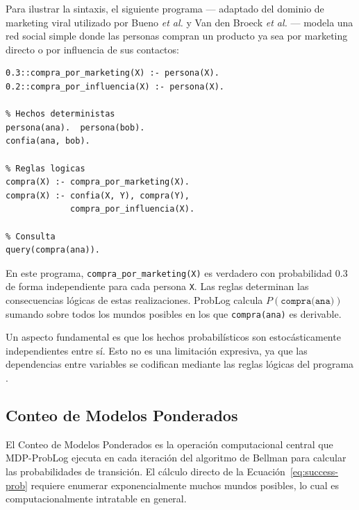 Para ilustrar la sintaxis, el siguiente programa --- adaptado del dominio de marketing viral utilizado por Bueno \textit{et al.} \cite{bueno2016mdp} y Van den Broeck \textit{et al.} \cite{vandenbroeck2010dtproblog} --- modela una red social simple donde las personas compran un producto ya sea por marketing directo o por influencia de sus contactos:

\begin{lstlisting}[caption={Programa ProbLog para un dominio de marketing viral (adaptado de \cite{bueno2016mdp}).}]
% Hechos probabilisticos (independientes)
0.3::compra_por_marketing(X) :- persona(X).
0.2::compra_por_influencia(X) :- persona(X).

% Hechos deterministas
persona(ana).  persona(bob).
confia(ana, bob).

% Reglas logicas
compra(X) :- compra_por_marketing(X).
compra(X) :- confia(X, Y), compra(Y),
             compra_por_influencia(X).

% Consulta
query(compra(ana)).
\end{lstlisting}

En este programa, \texttt{compra\_por\_marketing(X)} es verdadero con probabilidad 0.3 de forma independiente para cada persona \texttt{X}. Las reglas determinan las consecuencias lógicas de estas realizaciones. ProbLog calcula $P(\texttt{compra(ana)})$ sumando sobre todos los mundos posibles en los que \texttt{compra(ana)} es derivable.

Un aspecto fundamental es que los hechos probabilísticos son estocásticamente independientes entre sí. Esto no es una limitación expresiva, ya que las dependencias entre variables se codifican mediante las reglas lógicas del programa \cite{deraedt2015probabilistic}.

\clearpage

\subsection{Conteo de Modelos Ponderados}
\label{sec:mt-wmc}

El Conteo de Modelos Ponderados es la operación computacional central que MDP-ProbLog ejecuta en cada iteración del algoritmo de Bellman para calcular las probabilidades de transición. El cálculo directo de la Ecuación~\ref{eq:success-prob} requiere enumerar exponencialmente muchos mundos posibles, lo cual es computacionalmente intratable en general.

